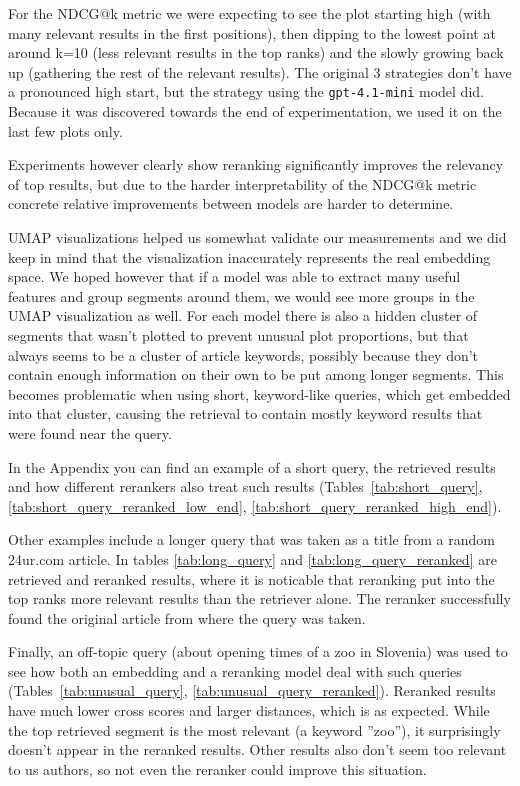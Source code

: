 \documentclass[conference]{IEEEtran}
\begin{document}
For the NDCG@k metric we were expecting to see the plot starting high (with many relevant results in the first positions), then dipping to the lowest point at around k=10 (less relevant results in the top ranks) and the slowly growing back up (gathering the rest of the relevant results). The original 3 strategies don't have a pronounced high start, but the strategy using the \texttt{gpt-4.1-mini} model did. Because it was discovered towards the end of experimentation, we used it on the last few plots only.

Experiments however clearly show reranking significantly improves the relevancy of top results, but due to the harder interpretability of the NDCG@k metric concrete relative improvements between models are harder to determine.

UMAP visualizations helped us somewhat validate our measurements and we did keep in mind that the visualization inaccurately represents the real embedding space. We hoped however that if a model was able to extract many useful features and group segments around them, we would see more groups in the UMAP visualization as well. For each model there is also a hidden cluster of segments that wasn't plotted to prevent unusual plot proportions, but that always seems to be a cluster of article keywords, possibly because they don't contain enough information on their own to be put among longer segments. This becomes problematic when using short, keyword-like queries, which get embedded into that cluster, causing the retrieval to contain mostly keyword results that were found near the query. 

In the Appendix you can find an example of a short query, the retrieved results and how different rerankers also treat such results (Tables~\ref{tab:short_query}, \ref{tab:short_query_reranked_low_end}, \ref{tab:short_query_reranked_high_end}). 

Other examples include a longer query that was taken as a title from a random 24ur.com article. In tables \ref{tab:long_query} and \ref{tab:long_query_reranked} are retrieved and reranked results, where it is noticable that reranking put into the top ranks more relevant results than the retriever alone. The reranker successfully found the original article from where the query was taken.

Finally, an off-topic query (about opening times of a zoo in Slovenia) was used to see how both an embedding and a reranking model deal with such queries (Tables~\ref{tab:unusual_query}, \ref{tab:unusual_query_reranked}). Reranked results have much lower cross scores and larger distances, which is as expected. While the top retrieved segment is the most relevant (a keyword ''zoo''), it surprisingly doesn't appear in the reranked results. Other results also don't seem too relevant to us authors, so not even the reranker could improve this situation. 
\end{document}
